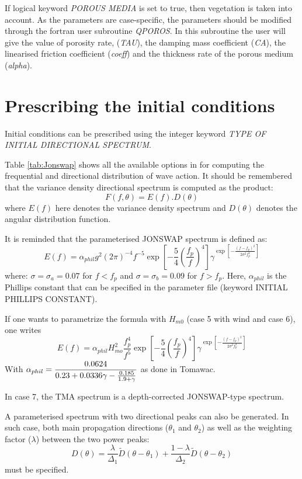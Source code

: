 If logical keyword \textit{POROUS MEDIA} is set to true, then vegetation is taken into account. As the parameters are case-specific,
the parameters should be modified through the fortran user subroutine \textit{QPOROS}. In this subroutine the user will give the
value of porosity rate, (\textit{TAU}), the damping mass coefficient (\textit{CA}),  the linearised friction coefficient
(\textit{coeff}) and the thickness rate of the porous medium (\textit{alpha}).

 \section{ Prescribing the initial conditions}
\label{se:initcond}
 Initial conditions can be prescribed using the integer keyword \textit{TYPE OF INITIAL DIRECTIONAL SPECTRUM}.

 Table \ref{tab:Jonswap} shows all the available options in \tomawac for computing the frequential and directional distribution of
 wave action. It should be remembered that the variance density directional spectrum is computed as the product:
\[F(f,\theta )=E(f).D(\theta )\]
where $E(f)$ here denotes the variance density spectrum and $D\left(\theta \right)$ denotes the angular distribution function.

 It is reminded that the parameterised JONSWAP spectrum is defined as:
 \[E(f)=\alpha _{phil} g^{2} (2\pi )^{-4} f^{-5} \exp \left[-\frac{5}{4} \left(\frac{f_{p}^{} }{f^{} } \right)^{4} \right]
 \gamma ^{\exp \left[-\frac{\left(f-f_{p} \right)^{2} }{2\sigma ^{2} f_{p}^{2} } \right]} \]
 where:  $\sigma =\sigma_{a} =0.07$ for  $f< f_{p}$  and  $\sigma =\sigma_{b} =0.09$ for  $f> f_{p}$. Here, $\alpha_{phil}$  is
 the Phillips constant that can be specified in the parameter file (keyword INITIAL PHILLIPS CONSTANT).

 If one wants to parametrize the formula with $H_{m0}$ (case 5 with wind and case 6), one writes
 \[E(f)=\alpha _{phil} H_{mo}^{2} \frac{f_{p}^{4} }{f^{5} } \exp \left[-\frac{5}{4} \left(\frac{f_{p}^{} }{f^{} } \right)^{4} \right]
 \gamma ^{\exp \left[-\frac{\left(f-f_{p} \right)^{2} }{2\sigma ^{2} f_{p}^{2} } \right]} \]
With $\displaystyle \alpha _{phil} =\frac{0.0624}{0.23+0.0336\gamma -\frac{0.185}{1.9+\gamma } } $ as done in Tomawac.

 In case 7, the TMA spectrum is a depth-corrected JONSWAP-type spectrum.

 A parameterised spectrum with two directional peaks can also be generated. In such case, both main propagation directions
 ($\theta _{1} $ and $\theta _{2} $) as well as the weighting factor ($\lambda $) between the two power peaks:
 \[D(\theta )=\frac{\lambda }{\Delta _{1} } \tilde{D}(\theta -\theta _{1} )+\frac{1-\lambda }{\Delta _{2} } \tilde{D}(\theta -
 \theta _{2} )\]
must be specified.

